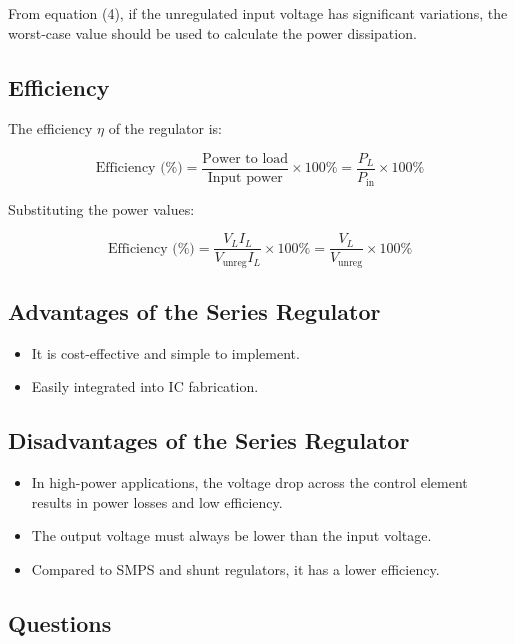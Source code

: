 \documentclass[a4paper,9pt,twoside,openany,twocolumn]{memoir}
\begin{document}
From equation (4), if the unregulated input voltage has significant variations, the worst-case value should be used to calculate the power dissipation.

\subsection*{Efficiency}

The efficiency \( \eta \) of the regulator is:

\[
\text{Efficiency (\%)} = \frac{\text{Power to load}}{\text{Input power}} \times 100\% = \frac{P_L}{P_{\text{in}}} \times 100\%
\]

Substituting the power values:

\[
\text{Efficiency (\%)} = \frac{V_L I_L}{V_{\text{unreg}} I_L} \times 100\% = \frac{V_L}{V_{\text{unreg}}} \times 100\%
\]

\subsection*{Advantages of the Series Regulator}

\begin{itemize}
    \item It is cost-effective and simple to implement.
    \item Easily integrated into IC fabrication.
\end{itemize}

\subsection*{Disadvantages of the Series Regulator}

\begin{itemize}
    \item In high-power applications, the voltage drop across the control element results in power losses and low efficiency.
    \item The output voltage must always be lower than the input voltage.
    \item Compared to SMPS and shunt regulators, it has a lower efficiency.
\end{itemize}

\subsection*{Questions}
\end{document}
